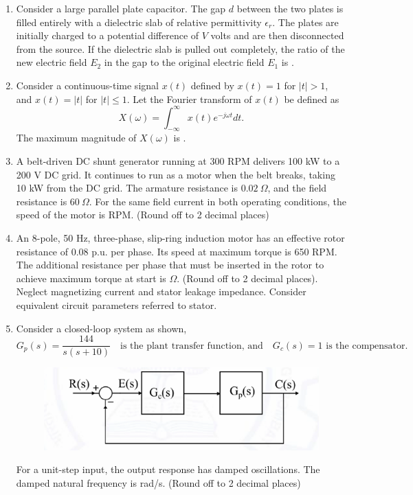 \documentclass[journal,12pt,onecolumn]{IEEEtran}
\theoremstyle{remark}
\begin{document}
\begin{flushleft}
\begin{enumerate}
\item Consider a large parallel plate capacitor. The gap $d$ between the two plates 
is filled entirely with a dielectric slab of relative permittivity $\epsilon_r$. 
The plates are initially charged to a potential difference of $V$ volts and are 
then disconnected from the source. If the dielectric slab is pulled out completely, 
the ratio of the new electric field $E_2$ in the gap to the original electric field 
$E_1$ is .

\item Consider a continuous-time signal $x(t)$ defined by $x(t) = 1$ for $|t| > 1$, 
and $x(t) = |t|$ for $|t| \leq 1$. Let the Fourier transform of $x(t)$ be defined as
\[
X(\omega) = \int_{-\infty}^{\infty} x(t) e^{-j\omega t} dt.
\]
The maximum magnitude of $X(\omega)$ is .

\item A belt-driven DC shunt generator running at 300 RPM delivers 100 kW to a 
200 V DC grid. It continues to run as a motor when the belt breaks, taking 10 kW 
from the DC grid. The armature resistance is $0.02~\Omega$, and the field resistance 
is $60~\Omega$. For the same field current in both operating conditions, the 
speed of the motor is  RPM. (Round off to 2 decimal places)

\item An 8-pole, 50 Hz, three-phase, slip-ring induction motor has an effective 
rotor resistance of 0.08 p.u. per phase. Its speed at maximum torque is 650 RPM. 
The additional resistance per phase that must be inserted in the rotor to achieve 
maximum torque at start is  $\Omega$. (Round off to 2 decimal places).  
Neglect magnetizing current and stator leakage impedance. Consider equivalent 
circuit parameters referred to stator.

\item Consider a closed-loop system as shown, 
\[
G_p(s) = \frac{144}{s(s+10)} \quad \text{is the plant transfer function, and} \quad 
G_c(s) = 1 \text{ is the compensator}.
\]  
\begin{figure}[H]
    \centering
    \includegraphics[width=0.5\columnwidth]{figs/56.png}
    \caption{}
    \label{fig:placeholder}
\end{figure}
For a unit-step input, the output response has damped oscillations. The damped 
natural frequency is  rad/s. (Round off to 2 decimal places)


\end{enumerate}
\end{flushleft}
\end{document}
